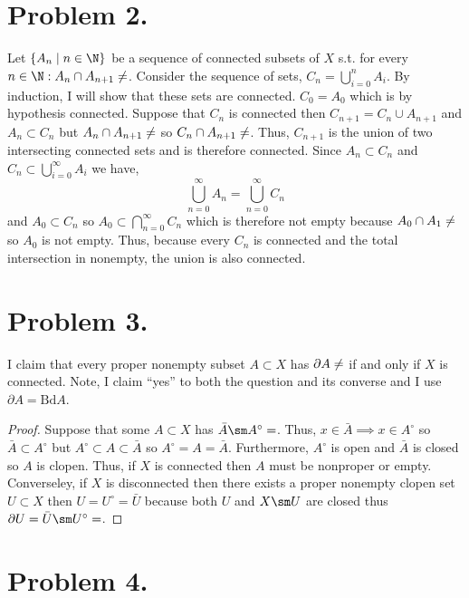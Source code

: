 \documentclass[12pt]{extarticle}
\begin{document}
\section*{Problem 2.}
Let $\{A_n \mid n \in \N \}$ be a sequence of connected subsets of $X$ s.t. for every $n \in \N : A_n \cap A_{n+1} \neq \empty$. Consider the sequence of sets, $C_n = \bigcup\limits_{i = 0}^{n} A_i$. By induction, I will show that these sets are connected. $C_0 = A_0$ which is by hypothesis connected. Suppose that $C_n$ is connected then $C_{n + 1} = C_n \cup A_{n+1}$ and $A_n \subset C_n$ but $A_n \cap A_{n+1} \neq \empty$ so $C_n \cap A_{n+1} \neq \empty$. Thus, $C_{n+1}$ is the union of two intersecting connected sets and is therefore connected. Since $A_n \subset C_n$ and $C_n \subset \bigcup\limits_{i = 0}^{\infty} A_i$ we have, \[\bigcup_{n = 0}^{\infty} A_n = \bigcup_{n = 0}^{\infty} C_n\] and $A_0 \subset C_n$ so $A_0 \subset \bigcap\limits_{n = 0}^{\infty} C_n$ which is therefore not empty because $A_0 \cap A_1 \neq \empty$ so $A_0$ is not empty. Thus, because every $C_n$ is connected and the total intersection in nonempty, the union is also connected.  

\section*{Problem 3.}

I claim that every proper nonempty subset $A \subset X$ has $\partial A \neq \empty$ if and only if $X$ is connected. Note, I claim ``yes'' to both the question and its converse and I use $\partial A = \mathrm{Bd} A$.
\begin{proof}
Suppose that some $A \subset X$ has $\bar{A} \sm A^\circ = \empty$. Thus, $x \in \bar{A} \implies x \in A^\circ$ so $\bar{A} \subset A^\circ$ but $A^\circ \subset A \subset \bar{A}$ so $A^\circ = A = \bar{A}$. Furthermore, $A^\circ$ is open and $\bar{A}$ is closed so $A$ is clopen. Thus, if $X$ is connected then $A$ must be nonproper or empty. Converseley, if $X$ is disconnected then there exists a proper nonempty clopen set $U \subset X$ then $U = U^\circ = \bar{U}$ because both $U$ and $X \sm U$ are closed thus $\partial U = \bar{U} \sm U^\circ = \empty$.  
\end{proof} 

\section*{Problem 4.}
\end{document}
